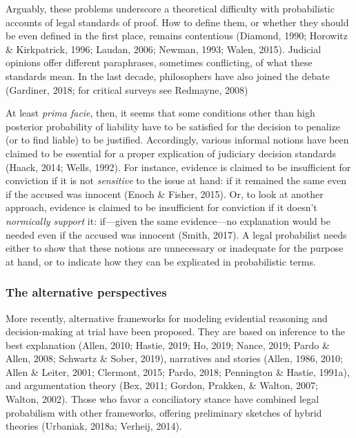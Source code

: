 \documentclass[11pt,dvipsnames,enabledeprecatedfontcommands]{scrartcl}
\begin{document}
Arguably, these problems underscore a theoretical difficulty with
probabilistic accounts of legal standards of proof. How to define them,
or whether they should be even defined in the first place, remains
contentious (Diamond, 1990; Horowitz \& Kirkpatrick, 1996; Laudan, 2006;
Newman, 1993; Walen, 2015). Judicial opinions offer different
paraphrases, sometimes conflicting, of what these standards mean. In the
last decade, philosophers have also joined the debate (Gardiner, 2018;
for critical surveys see Redmayne, 2008)

At least \emph{prima facie}, then, it seems that some conditions other
than high posterior probability of liability have to be satisfied for
the decision to penalize (or to find liable) to be justified.
Accordingly, various informal notions have been claimed to be essential
for a proper explication of judiciary decision standards (Haack, 2014;
Wells, 1992). For instance, evidence is claimed to be insufficient for
conviction if it is not \emph{sensitive} to the issue at hand: if it
remained the same even if the accused was innocent (Enoch \& Fisher,
2015). Or, to look at another approach, evidence is claimed to be
insufficient for conviction if it doesn't \emph{normically support} it:
if---given the same evidence---no explanation would be needed even if
the accused was innocent (Smith, 2017). A legal probabilist needs either
to show that these notions are unnecessary or inadequate for the purpose
at hand, or to indicate how they can be explicated in probabilistic
terms.

\subsubsection{The alternative
perspectives}\label{the-alternative-perspectives}

More recently, alternative frameworks for modeling evidential reasoning
and decision-making at trial have been proposed. They are based on
inference to the best explanation (Allen, 2010; Hastie, 2019; Ho, 2019;
Nance, 2019; Pardo \& Allen, 2008; Schwartz \& Sober, 2019), narratives
and stories (Allen, 1986, 2010; Allen \& Leiter, 2001; Clermont, 2015;
Pardo, 2018; Pennington \& Hastie, 1991a), and argumentation theory
(Bex, 2011; Gordon, Prakken, \& Walton, 2007; Walton, 2002). Those who
favor a conciliatory stance have combined legal probabilism with other
frameworks, offering preliminary sketches of hybrid theories (Urbaniak,
2018a; Verheij, 2014).
\end{document}
